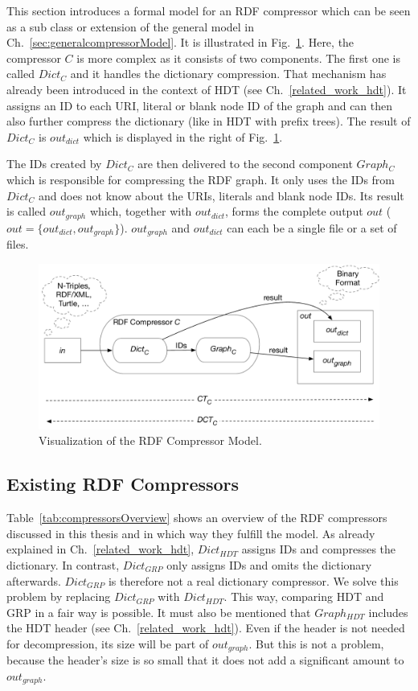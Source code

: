 This section introduces a formal model for an RDF compressor which can be seen as a sub class or extension of the general model in Ch.~\ref{sec:generalcompressorModel}. It is illustrated in Fig.~\ref{fig:compressorModel}. Here, the compressor $C$ is more complex as it consists of two components. The first one is called $Dict_C$ and it handles the dictionary compression. That mechanism has already been introduced in the context of HDT (see Ch.~\ref{related_work_hdt}). It assigns an ID to each URI, literal or blank node ID of the graph and can then also further compress the dictionary (like in HDT with prefix trees). The result of $Dict_C$ is $out_{dict}$ which is displayed in the right of Fig.~\ref{fig:compressorModel}. 

The IDs created by $Dict_C$ are then delivered to the second component $Graph_C$ which is responsible for compressing the RDF graph. It only uses the IDs from $Dict_C$ and does not know about the URIs, literals and blank node IDs. Its result is called $out_{graph}$ which, together with $out_{dict}$, forms the complete output $out$ ($out=\{out_{dict}, out_{graph}\} $). $out_{graph}$ and $out_{dict}$ can each be a single file or a set of files. 

\begin{figure}
	\centering
	\includegraphics[width=\linewidth]{figures/approach/model}
	\caption{Visualization of the RDF Compressor Model.}
	\label{fig:compressorModel}
\end{figure}


\subsection{Existing RDF  Compressors}

Table~\ref{tab:compressorsOverview} shows an overview of the RDF compressors discussed in this thesis and in which way they fulfill the model. As already explained in Ch.~\ref{related_work_hdt}, $Dict_{HDT}$ assigns IDs and compresses the dictionary. In contrast, $Dict_{GRP}$  only assigns IDs and omits the dictionary afterwards. $Dict_{GRP}$ is therefore not a real dictionary compressor. We solve this problem by replacing  $Dict_{GRP}$ with $Dict_{HDT}$. This way, comparing HDT and GRP in a fair way is possible. It must also be mentioned that $Graph_{HDT}$ includes the HDT header (see Ch.~\ref{related_work_hdt}). Even if the header is not needed for decompression, its size will be part of $out_{graph}$. But this is not a problem, because the header's size is so small that it does not add a significant amount to $out_{graph}$.

